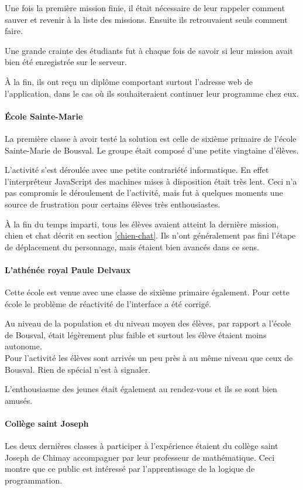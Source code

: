 Une fois la première mission finie, il était nécessaire de leur rappeler comment sauver et revenir à la liste des missions. Ensuite ils retrouvaient seuls comment faire. 

Une grande crainte des étudiants fut à chaque fois de savoir si leur mission avait bien été enregistrée sur le serveur.

À la fin, ils ont reçu un diplôme comportant surtout l'adresse web de l'application, dans le cas où ils souhaiteraient continuer leur programme chez eux.

\paragraph{École Sainte-Marie} 
La première classe à avoir testé la solution est celle de sixième primaire de l'école Sainte-Marie de Bousval. Le groupe était composé d'une petite vingtaine d'élèves.

L'activité s'est déroulée avec une petite contrariété informatique. En effet l'interpréteur JavaScript des machines mises à disposition était très lent. Ceci n'a pas compromis le déroulement de l'activité, mais fut à quelques moments une source de frustration pour certains élèves très enthousiastes.

À la fin du temps imparti, tous les élèves avaient atteint la dernière mission, chien et chat décrit en section \ref{chien-chat}. Ils n'ont généralement pas fini l'étape de déplacement du personnage, mais étaient bien avancés dans ce sens.

\paragraph{L'athénée royal Paule Delvaux}
Cette école est venue avec une classe de sixième primaire également. Pour cette école le problème de réactivité de l'interface a été corrigé.

Au niveau de la population et du niveau moyen des élèves, par rapport a l'école de Bousval, était légèrement plus faible et surtout les élève étaient moins autonome.\\

Pour l'activité les élèves sont arrivés un peu près à au même niveau que ceux de Bousval. Rien de spécial n'est à signaler.

L'enthousiasme des jeunes était également au rendez-vous et ils se sont bien amusés.

\paragraph{Collège saint Joseph}
Les deux dernières classes à participer à l'expérience étaient du collège saint Joseph de Chimay accompagner par leur professeur de mathématique. Ceci montre que ce public est intéressé par l'apprentissage de la logique de programmation.

